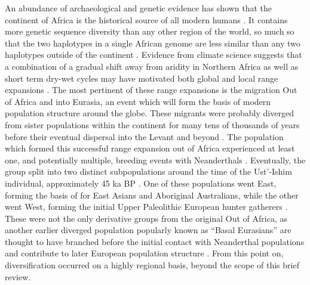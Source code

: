 An abundance of archaeological and genetic evidence has shown that the continent of Africa is the historical source of all modern humans \cite{Lopez2015}. It contains more genetic sequence diversity than any other region of the world, so much so that the two haplotypes in a single African genome are less similar than any two haplotypes outside of the continent \cite{Mallick2016}. Evidence from climate science suggests that a combination of a gradual shift away from aridity in Northern Africa as well as short term dry-wet cycles may have motivated both global and local range expansions \cite{Schaebitz2021, Timmermann2016}. The most pertinent of these range expansions is the migration Out of Africa and into Eurasia, an event which will form the basis of modern population structure around the globe. These migrants were probably diverged from sister populations within the continent for many tens of thousands of years before their eventual dispersal into the Levant and beyond \cite{Bergstrom2019, Schiffels2014}. The population which formed this successful range expansion out of Africa experienced at least one, and potentially multiple, breeding events with Neanderthals \cite{Sankararaman2012}. Eventually, the group split into two distinct subpopulations around the time of the Ust'-Ishim individual, approximately 45 ka BP \cite{Fu2014}. One of these populations went East, forming the basis of for East Asians and Aboriginal Australians, while the other went West, forming the initial Upper Paleolithic European hunter gatherers \cite{Skoglund2017,Lipson2017}. These were not the only derivative groups from the original Out of Africa, as another earlier diverged population popularly known as ``Basal Eurasians'' are thought to have branched before the initial contact with Neanderthal populations and contribute to later European population structure \cite{Lazaridis2014}. From this point on, diversification occurred on a highly regional basis, beyond the scope of this brief review. 


